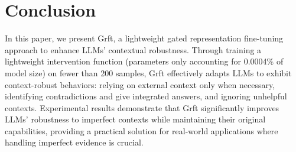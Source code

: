 \vspace{-0.1in}
\section{Conclusion}
\vspace{-0.1in}
\label{Conclusion}
In this paper, we present Grft, a lightweight gated representation fine-tuning approach to enhance LLMs' contextual robustness. Through training a lightweight intervention function (parameters only accounting for 0.0004\% of model size)  on fewer than 200 samples, Grft effectively adapts LLMs to exhibit context-robust behaviors: relying on external context only when necessary, identifying contradictions and give integrated answers, and ignoring unhelpful contexts. Experimental results demonstrate that Grft significantly improves LLMs' robustness to imperfect contexts while maintaining their original capabilities, providing a practical solution for real-world applications where handling imperfect evidence is crucial.






